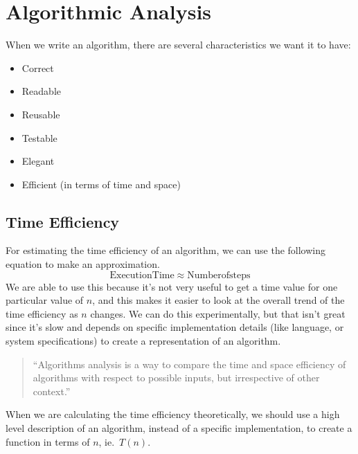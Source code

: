 \section{Algorithmic Analysis}\label{sec:algorithmic_analysis}

When we write an algorithm, there are several characteristics we want it to have:
\begin{itemize}
    \item Correct
    \item Readable
    \item Reusable
    \item Testable
    \item Elegant
    \item Efficient (in terms of time and space)
\end{itemize}

\subsection{Time Efficiency}\label{sub:time_efficiency}

For estimating the time efficiency of an algorithm, we can use the following equation to make an approximation.
\[
    \mathrm{Execution Time} \approx \mathrm{Number of steps}
\]
We are able to use this because it's not very useful to get a time value for one particular value of \(n\), and this makes it easier to look at the overall trend of the time efficiency as \(n\) changes.
We can do this experimentally, but that isn't great since it's slow and depends on specific implementation details (like language, or system specifications) to create a representation of an algorithm.
\begin{quote}
    ``Algorithms analysis is a way to compare the time and space efficiency of algorithms with respect to possible inputs, but irrespective of other context.''
\end{quote}
When we are calculating the time efficiency theoretically, we should use a high level description of an algorithm, instead of a specific implementation, to create a function in terms of \(n\), ie.\ \(T(n)\).

